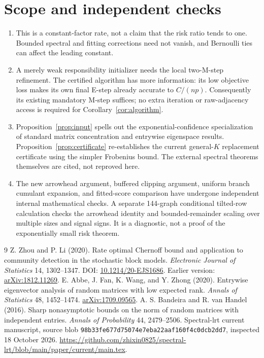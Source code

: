 \documentclass[11pt]{article}
\begin{document}
\section{Scope and independent checks}
\begin{enumerate}
\item This is a constant-factor rate, not a claim that the risk ratio tends to one. Bounded spectral and fitting corrections need not vanish, and Bernoulli ties can affect the leading constant.
\item A merely weak responsibility initializer needs the local two-M-step refinement. The certified algorithm has more information: its low objective loss makes its own final E-step already accurate to $C/(np)$. Consequently its existing mandatory M-step suffices; no extra iteration or raw-adjacency access is required for Corollary~\ref{cor:algorithm}.
\item Proposition~\ref{prop:input} spells out the exponential-confidence specialization of standard matrix concentration and entrywise eigenspace results. Proposition~\ref{prop:certificate} re-establishes the current general-$K$ replacement certificate using the simpler Frobenius bound. The external spectral theorems themselves are cited, not reproved here.
\item The new arrowhead argument, buffered clipping argument, uniform branch cumulant expansion, and fitted-score comparison have undergone independent internal mathematical checks. A separate 144-graph conditional tilted-row calculation checks the arrowhead identity and bounded-remainder scaling over multiple sizes and signal signs. It is a diagnostic, not a proof of the exponentially small risk theorem.
\end{enumerate}

\begin{thebibliography}{9}
 Z. Zhou and P. Li (2020). Rate optimal Chernoff bound and application to community detection in the stochastic block models. \emph{Electronic Journal of Statistics} 14, 1302--1347. DOI: \href{https://doi.org/10.1214/20-EJS1686}{10.1214/20-EJS1686}. Earlier version: \href{https://arxiv.org/abs/1812.11269}{arXiv:1812.11269}.
 E. Abbe, J. Fan, K. Wang, and Y. Zhong (2020). Entrywise eigenvector analysis of random matrices with low expected rank. \emph{Annals of Statistics} 48, 1452--1474. \href{https://arxiv.org/abs/1709.09565}{arXiv:1709.09565}.
 A. S. Bandeira and R. van Handel (2016). Sharp nonasymptotic bounds on the norm of random matrices with independent entries. \emph{Annals of Probability} 44, 2479--2506.
 Spectral-lrt current manuscript, source blob \texttt{98b33fe677d75074e7eba22aaf160f4c0dcb2dd7}, inspected 18 October 2026. \url{https://github.com/zhixin0825/spectral-lrt/blob/main/paper/current/main.tex}.
\end{thebibliography}
\end{document}
